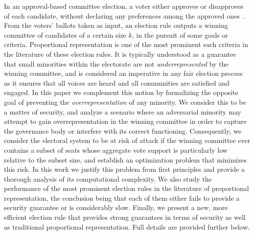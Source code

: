



In an approval-based committee election, a voter either approves or disapproves of each candidate, without declaring any preferences among the approved ones~\cite{lackner2020approval}. From the voters' ballots taken as input, an election rule outputs a winning committee of candidates of a certain size $k$, in the pursuit of some goals or criteria. Proportional representation is one of the most prominent such criteria in the literature of these election rules. It is typically understood as a guarantee that small minorities within the electorate are not \emph{underrepresented} by the winning committee, and is considered an imperative in any fair election process as it ensures that all voices are heard and all communities are satisfied and engaged. 
In this paper we complement this notion by formalizing the opposite goal of preventing the \emph{overrepresentation} of any minority. We consider this to be a matter of security, and analyze a scenario where an adversarial minority may attempt to gain overrepresentation in the winning committee in order to capture the governance body or interfere with its correct functioning. 
%
Consequently, we consider the electoral system to be at risk of attack if the winning committee ever contains a subset of seats whose aggregate vote support is particularly low relative to the subset size, and establish an optimization problem that minimizes this risk. 
In this work we justify this problem from first principles and provide a thorough analysis of its computational complexity. 
We also study the performance of the most prominent election rules in the literature of proportional representation, the conclusion being that each of them either fails to provide a security guarantee or is considerably slow. Finally, we present a new, more efficient election rule that provides strong guarantees in terms of security as well as traditional proportional representation. Full details are provided further below.


